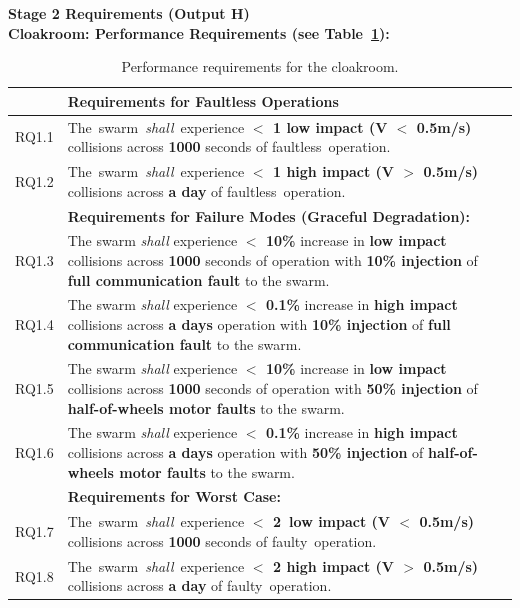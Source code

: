 \documentclass[lettersize,journal]{IEEEtran}
\begin{document}
\noindent \textbf{Stage 2 Requirements (Output H)}\\
\noindent \textbf{Cloakroom: Performance Requirements (see Table~\ref{tab:perormance}):}
\begin{table}[!t]
	\centering
	\begin{tabular}{|p{7mm}|p{72mm}|}
		\hline
		& \textbf{Requirements for Faultless Operations} \\
		\hline
		RQ1.1 & The swarm \emph{shall} experience \textbf{$<$ 1 low impact (V $<$ 0.5m/s)} collisions across \textbf{1000} seconds of faultless operation. \\ 
		\hline
		RQ1.2 & The swarm \emph{shall} experience \textbf{$<$ 1 high impact (V $>$ 0.5m/s)} collisions across \textbf{a day} of faultless operation. \\ 
		\hline
		& \textbf{Requirements for Failure Modes (Graceful Degradation): } \\
		\hline
		RQ1.3 & The swarm \emph{shall} experience \textbf{$<$ 10\%} increase in \textbf{low impact} collisions across \textbf{1000} seconds of operation with \textbf{10\% injection} of \textbf{full communication fault} to the swarm. \\
		\hline
		RQ1.4 & The swarm \emph{shall} experience \textbf{$<$ 0.1\%} increase in \textbf{high impact} collisions across \textbf{a days} operation with \textbf{10\% injection} of \textbf{full communication fault} to the swarm.\\ 
		\hline
		RQ1.5 & The swarm \emph{shall} experience \textbf{$<$ 10\%} increase in \textbf{low impact} collisions across \textbf{1000} seconds of operation with \textbf{50\% injection} of \textbf{half-of-wheels motor faults} to the swarm.\\
		\hline
		RQ1.6 & The swarm \emph{shall} experience \textbf{$<$ 0.1\%} increase in \textbf{high impact} collisions across \textbf{a days} operation with \textbf{50\% injection} of \textbf{half-of-wheels motor faults} to the swarm.	\\	
		\hline
		& \textbf{Requirements for Worst Case: } \\
		\hline
		RQ1.7 & The swarm \emph{shall} experience \textbf{$<$ 2 low impact (V $<$ 0.5m/s)} collisions across \textbf{1000} seconds of faulty operation. \\			\hline	
		RQ1.8 & The swarm \emph{shall} experience \textbf{$<$ 2 high impact (V $>$ 0.5m/s)} collisions across \textbf{a day} of faulty operation.  \\		[1ex] 		
		\hline
	\end{tabular}
	\caption{\label{tab:perormance}Performance requirements for the cloakroom.}
\end{table}    
\end{document}
